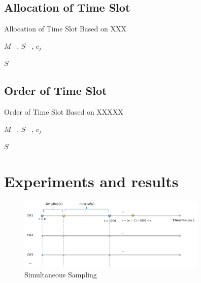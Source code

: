 \documentclass[conference,compsoc]{IEEEtran}
\begin{document}
\subsection{Allocation of Time Slot}

\begin{algorithm}[h]
\caption{Allocation of Time Slot Based on XXX}
\begin{algorithmic}[1]
\REQUIRE  $M$ ~, $S$ ~, $c_j$

\RETURN $S$
\label{code:recentEnd}
\end{algorithmic}
\end{algorithm}


\subsection{Order of Time Slot}
 
\begin{algorithm}[h]
\caption{Order of Time Slot Based on XXXXX}
\begin{algorithmic}[1]
\REQUIRE  $M$ ~, $S$ ~, $c_j$

\RETURN $S$
\label{code:recentEnd}
\end{algorithmic}
\end{algorithm}



\section{Experiments and results}

 
\begin{figure}[!hhhhhhhhhht]
\centering
\includegraphics[width=9cm]{images/png_same_time_sampling.png}
\caption{Simultaneous Sampling}
\label{Simultaneous_Sampling}
\end{figure}



 
\end{document}
